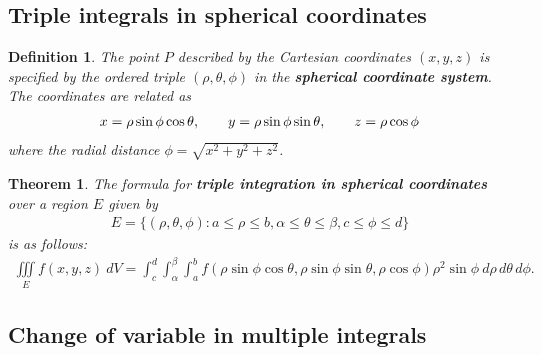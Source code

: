 \documentclass{article}
\theoremstyle{sltheorem}
\newtheorem{definition}{Definition}[section]
\newtheorem{theorem}{Theorem}[section]
\newcommand{\ti}{\iiint\limits}
\newcommand{\hs}{\hspace{0.7cm}}
\newcommand*\B[1]{\textbf{#1}}
\begin{document}
\subsection{Triple integrals in spherical coordinates}
\begin{definition}
    The point $P$ described by the Cartesian coordinates $(x,y,z)$ is specified by the ordered
    triple $(\rho,\theta,\phi)$ in the \B{spherical coordinate system}. The coordinates are
    related as
    \begin{align*}
        x=\rho\sin\phi\cos\theta,\hs y = \rho \sin\phi\sin\theta,\hs z = \rho\cos\phi
    \end{align*}
    where the radial distance $\phi=\sqrt{x^2+y^2+z^2}$.
\end{definition}
\begin{theorem}
    The formula for \B{triple integration in spherical coordinates} over a region $E$ 
    given by
    \begin{align*}
        E=\{(\rho,\theta,\phi):a\leq\rho\leq b,\alpha\leq\theta\leq\beta, c\leq\phi\leq d\}
    \end{align*}
    is as follows:
    \begin{align*}
        \ti_E f(x,y,z)\:dV = \int_c^d \int_\alpha^\beta \int_a^b f(\rho\sin\phi\cos\theta,\rho\sin\phi\sin\theta,\rho\cos\phi)\rho^2\sin\phi\:d\rho\,d\theta\,d\phi.
    \end{align*}
\end{theorem}
\subsection{Change of variable in multiple integrals}
\end{document}
